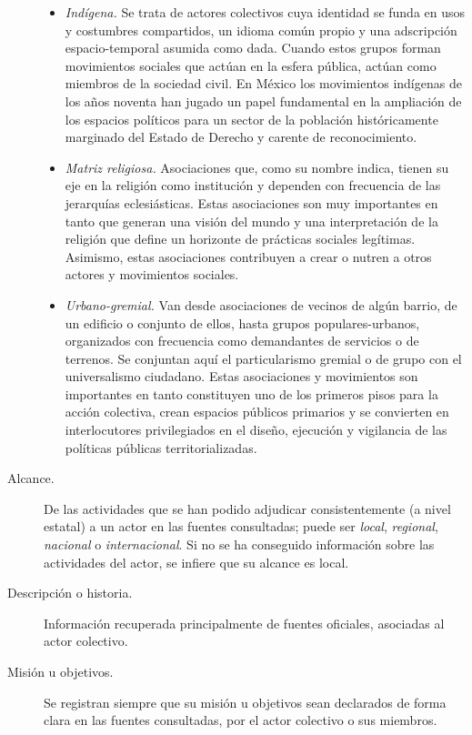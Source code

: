 \documentclass[letterpaper, 11pt]{book}
\theoremstyle{definition}
\theoremstyle{remark}
\begin{document}
\begin{description}
\begin{itemize}
        \item \emph{Indígena.}  Se trata de actores colectivos cuya identidad se funda en usos y costumbres compartidos, un idioma común propio y una adscripción espacio-temporal asumida como dada. Cuando estos grupos forman movimientos sociales que actúan en la esfera pública, actúan como miembros de la sociedad civil. 
        En México los movimientos indígenas de los años noventa han jugado un papel fundamental en la ampliación de los espacios políticos para un sector de la población históricamente marginado del Estado de Derecho y carente de reconocimiento.
        \item \emph{Matriz religiosa.} Asociaciones que, como su nombre indica, tienen su eje en la religión como institución y dependen con frecuencia de las jerarquías eclesiásticas. Estas asociaciones son muy importantes en tanto que generan una visión del mundo y una interpretación de la religión que define un horizonte de prácticas sociales legítimas. 
        Asimismo, estas asociaciones contribuyen a crear o nutren a otros actores y movimientos sociales.
        \item \emph{Urbano-gremial.} Van desde asociaciones de vecinos de algún barrio, de un edificio o conjunto de ellos, hasta grupos populares-urbanos, organizados con frecuencia como demandantes de servicios o de terrenos. 
        Se conjuntan aquí el particularismo gremial o de grupo con el universalismo ciudadano. 
        Estas asociaciones y movimientos son importantes en tanto constituyen uno de los primeros pisos para la acción colectiva, crean espacios públicos primarios y se convierten en interlocutores privilegiados en el diseño, ejecución y vigilancia de las políticas públicas territorializadas.
    \end{itemize}
    
    \item[Alcance.] De las actividades que se han podido adjudicar consistentemente (a nivel estatal) a un actor en las fuentes consultadas; puede ser \emph{local}, \emph{regional}, \emph{nacional} o \emph{internacional}. 
    Si no se ha conseguido información sobre las actividades del actor, se infiere que su alcance es local.
    
    \item[Descripción o historia.] Información recuperada principalmente de fuentes oficiales, asociadas al actor colectivo.
    
    \item[Misión u objetivos.] Se registran siempre que su misión u objetivos sean declarados de forma clara en las fuentes consultadas, por el actor colectivo o sus miembros.
    

\end{description}
\end{document}
